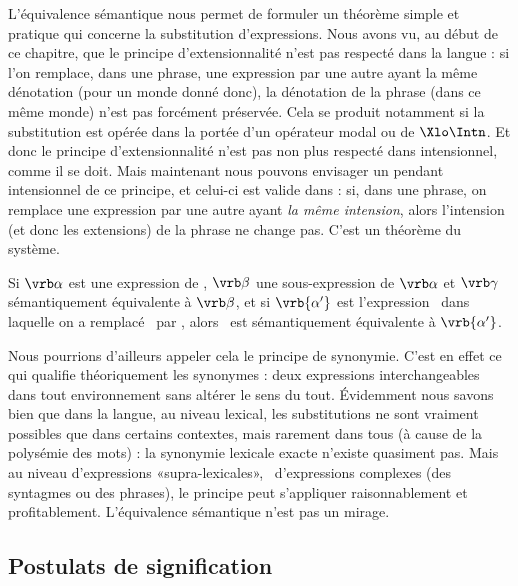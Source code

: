 L'équivalence sémantique nous permet de formuler un théorème simple et pratique qui concerne la substitution d'expressions. 
Nous avons vu, au début de ce chapitre, que le principe d'extensionnalité n'est pas respecté dans la langue : si l'on remplace, dans une phrase, une expression par une autre ayant la même dénotation (pour un monde donné donc), la dénotation de la phrase (dans ce même monde) n'est pas forcément préservée. Cela se produit notamment si la substitution est opérée dans la portée d'un opérateur modal ou de $\Xlo\Intn$.  Et donc le principe d'extensionnalité n'est pas non plus respecté dans {\LO} intensionnel, comme il se doit.
Mais maintenant nous pouvons envisager un pendant intensionnel de ce principe, et celui-ci est valide dans {\LO} :
si, dans une phrase, on remplace une expression par une autre ayant \emph{la même intension}, alors l'intension (et donc les extensions) de la phrase ne change pas.  C'est un théorème du système.

\begin{theo}\label{th:syno}
Si $\vrb\alpha$ est une
expression de {\LO}, $\vrb\beta$ une sous-expression de $\vrb\alpha$ et
$\vrb\gamma$  sémantiquement équivalente à $\vrb\beta$,  et
si $\vrb{\alpha'}$ est l'expression \vrb\alpha\ dans laquelle on a remplacé \vrb\beta\ par \vrb\gamma, alors \vrb\alpha\ est sémantiquement équivalente à $\vrb{\alpha'}$.
\end{theo}

Nous pourrions d'ailleurs appeler cela le principe de synonymie. 
C'est en effet ce qui qualifie théoriquement les synonymes : deux expressions interchangeables dans tout environnement sans altérer le sens du tout.  Évidemment nous savons bien que dans la langue, au niveau lexical, les substitutions ne sont vraiment possibles que dans certains contextes, mais rarement dans tous (à cause de la polysémie des mots) : la synonymie lexicale exacte n'existe quasiment pas. 
Mais au niveau d'expressions «supra-lexicales», \ie\ d'expressions complexes (des syntagmes ou des phrases), le principe peut s'appliquer raisonnablement et profitablement. 
L'équivalence sémantique n'est pas un mirage.


\subsection{Postulats de signification}
\label{sss:pds}

